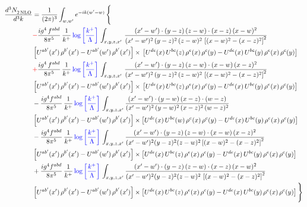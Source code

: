 \documentclass[9pt]{article}
\newcommand{\chg}[1]{{\color{red}#1}}
\numberwithin{equation}{section}
\begin{document}
\begin{align}
   \frac{d^{3}N_{2\,\rm NLO}^{\rm}}{d^{3}k}  & = \frac{1}{(2\pi)^{3}}  \int_{w, w^\prime} e^{-ik(w^\prime-w)}\, \Bigg\{\notag \\ &  \chg{-}\frac{ig^{4}\, f^{abd}}{8\pi^{5}}\, \frac{1}{k^{+}}\,{\color{blue}\log{\left[\frac{k^{+}}{\Lambda}\right]}}\, \int_{x,y,z,x'}\,\frac{(x'-w')\cdot  (y-z)\, (z-w)\cdot (x-z)\, (x-w)^{2}}{(x'-w')^{2}\, (y-z)^{2}\, (z-w)^{2}\,\left[(x-w)^{2}-(x-z)^{2}\right]^{2}}\, \notag \\ & \left[U^{ab'}(x')\,\rho^{b'}(x')-U^{ab'}(w')\, \rho^{b'}(x')\right]\times\,\left[U^{de}(x)\,U^{bc}(z)\, \rho^{e}(x)\,\rho^{c}(y)-U^{de}(x)\,U^{bc}(y)\,\rho^{e}(x)\,\rho^{c}(y)\right]\notag \\ &   \chg{+} \frac{ig^{4}\, f^{abd}}{8\pi^{5}}\, \frac{1}{k^{+}}\,{\color{blue}\log{\left[\frac{k^{+}}{\Lambda}\right]}}\, \int_{x,y,z,x'}\,\frac{(x'-w')\cdot  (y-z)\, (z-w)\cdot (x-w)\, (x-z)^{2}}{(x'-w')^{2}\, (y-z)^{2}\, (z-w)^{2}\,\left[(x-w)^{2}-(x-z)^{2}\right]^{2}}\, \notag \\ & \left[U^{ab'}(x')\,\rho^{b'}(x')-U^{ab'}(w')\, \rho^{b'}(x')\right]\times\,\left[U^{de}(x)\,U^{bc}(z)\, \rho^{e}(x)\,\rho^{c}(y)-U^{de}(x)\,U^{bc}(y)\,\rho^{e}(x)\,\rho^{c}(y)\right]\notag \\ & -\frac{ig^{4}f^{abd}}{8\pi^{5}}\,\frac{1}{k^{+}}\,{\color{blue}\log{\left[\frac{k^{+}}{\Lambda}\right]}}\,\int_{x,y,z,x'}
\frac{(x'-w')\cdot (y-w)\, (x-z)\cdot (w-z)}{(x'-w')^{2}\, (y-w)^{2}\, (x-z)^{2}\, (w-z)^{2}}\notag \\ & \left[U^{ab'}(x')\,\rho^{b'}(x')-U^{ab'}(w')\, \rho^{b'}(x')\right]\times \left[U^{de}(x)\,U^{bc}(w)\, \rho^{e}(x)\,\rho^{c}(y)-U^{de}(x)\,U^{bc}(y)\,\rho^{e}(x)\,\rho^{c}(y)\right]\notag \\ & -\frac{ig^{4}f^{abd}}{8\pi^{5}}\,\frac{1}{k^{+}}\,{\color{blue}\log{\left[\frac{k^{+}}{\Lambda}\right]}}\,\int_{x,y,z,x'}
\frac{(x'-w')\cdot(y-z)\,(z-w)\cdot(x-w)\,(x-z)^{2}}{(x'-w')^{2}(y-z)^{2}(z-w)^{2}\left[(x-w)^{2}-(x-z)^{2}\right]^{2}}\notag \\ & \left[U^{ab'}(x')\,\rho^{b'}(x')-U^{ab'}(w')\, \rho^{b'}(x')\right]\times \left[U^{de}(x)\,U^{bc}(z)\, \rho^{e}(x)\,\rho^{c}(y)-U^{de}(x)\,U^{bc}(y)\,\rho^{e}(x)\,\rho^{c}(y)\right]\notag \\ & +\frac{ig^{4}f^{abd}}{8\pi^{5}}\,\frac{1}{k^{+}}\,{\color{blue}\log{\left[\frac{k^{+}}{\Lambda}\right]}}\,\int_{x,y,z,x'}
\frac{(x'-w')\cdot(y-z)\,(z-w)\cdot(x-z)\,(x-w)^{2}}{(x'-w')^{2}(y-z)^{2}(z-w)^{2}\,\left[(x-w)^{2}-(x-z)^{2}\right]^{2}}\notag \\ & \left[U^{ab'}(x')\,\rho^{b'}(x')-U^{ab'}(w')\, \rho^{b'}(x')\right]\times \left[U^{de}(x)\,U^{bc}(z)\, \rho^{e}(x)\,\rho^{c}(y)-U^{de}(x)\,U^{bc}(y)\,\rho^{e}(x)\,\rho^{c}(y)\right]\Bigg\} 
\end{align}   
\end{document}
